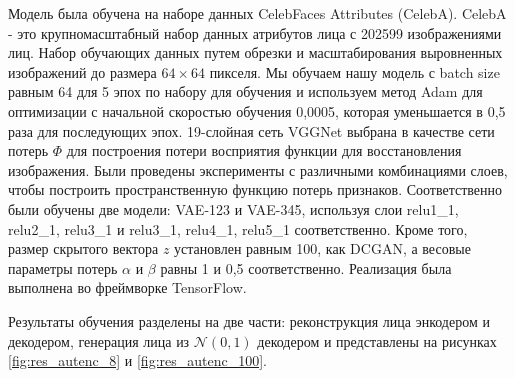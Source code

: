 Модель была обучена на наборе данных CelebFaces Attributes (CelebA). CelebA - это крупномасштабный набор данных атрибутов лица с 202599 изображениями лиц. Набор обучающих данных путем обрезки и масштабирования выровненных изображений до размера $64 \times 64$ пикселя. Мы обучаем нашу модель с batch size равным  64 для 5 эпох по набору для обучения и используем метод Adam для оптимизации с начальной скоростью обучения 0,0005, которая уменьшается в 0,5 раза для последующих эпох. 19-слойная сеть VGGNet выбрана в качестве сети потерь $\Phi$ для построения потери восприятия функции для восстановления изображения.
Были проведены эксперименты с различными комбинациями слоев, чтобы построить пространственную функцию потерь признаков. Соответственно были обучены две модели: VAE-123 и VAE-345, используя слои relu1\_1, relu2\_1, relu3\_1 и relu3\_1, relu4\_1, relu5\_1 соответственно. Кроме того, размер скрытого вектора $z$ установлен равным 100, как DCGAN, а весовые параметры потерь $\alpha$ и $\beta$ равны 1 и 0,5 соответственно. Реализация была выполнена во фреймворке TensorFlow.

Результаты обучения разделены на две части: реконструкция лица энкодером и декодером, генерация лица из $\mathcal{N}(0, 1)$ декодером и представлены на рисунках \ref{fig:res_autenc_8} и \ref{fig:res_autenc_100}.

